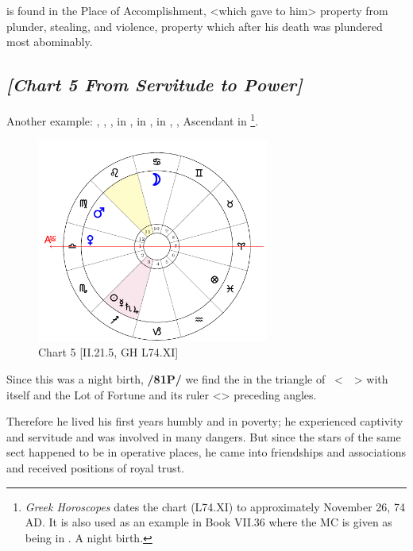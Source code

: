 \Mars\xspace is found in the Place of Accomplishment, <which gave to him> property from plunder, stealing, and violence, property which after his death was plundered most abominably.
\newpage
\subsection*{\textit{[Chart 5 From Servitude to Power]}}

Another example: \Sun, \Mercury, \Saturn, \Jupiter\xspace in \Sagittarius, \Moon\xspace in \Cancer, \Mars\xspace in \Virgo,
\Venus, Ascendant in \Libra
\footnote{\textit{Greek Horoscopes} dates the chart (L74.XI) to approximately November 26, 74 AD. It is also used as an example in Book VII.36 where the MC is given as being in \Cancer. A night birth.}.

\clearpage
\begin{figure}
\centering
\includegraphics[width=0.68\textwidth]{charts/2_21_5}
\caption{Chart 5 [II.21.5, GH L74.XI]}
\label{fig:chart05}
\end{figure}

Since this was a night birth, \textbf{/81P/} we find the \Moon\xspace in the triangle of \Mars\, <\Cancer\, \Scorpio\, \Pisces> with \Mars\xspace itself and the Lot of Fortune and its ruler <\Jupiter> preceding angles.

Therefore he lived his first years humbly and in poverty; he experienced captivity and servitude and was involved in many dangers. But since the stars of the same sect happened to be in operative places, he came into friendships and associations and received positions of royal trust. 

